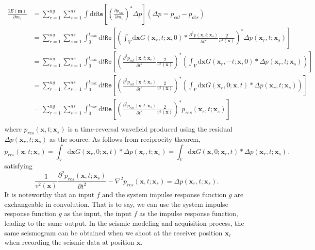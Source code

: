\begin{equation}
\begin{split}
\frac{\partial E(\textbf{m})}{\partial m_i}
&=\sum_{r=1}^{ng}\sum_{s=1}^{ns}\int \mathrm{d}t\mathtt{Re} \left[\left(\frac{\partial p_{cal}}{\partial m_i}\right)^*\Delta p\right] (\Delta p=p_{cal}-p_{obs})\\
&=\sum_{r=1}^{ng}\sum_{s=1}^{ns}\int_{0}^{t_{\max}}\mathrm{d}t\mathtt{Re} \left[\left(\int_V \mathrm{d}\textbf{x} G(\textbf{x}_r,t;\textbf{x},0)*
\frac{\partial^2 p(\textbf{x},t;\textbf{x}_s)}{\partial t^2}\frac{2}{v^3(\textbf{x})}\right)^*\Delta p(\textbf{x}_r,t;\textbf{x}_s)\right]\\
&=\sum_{r=1}^{ng}\sum_{s=1}^{ns}\int_{0}^{t_{\max}}\mathrm{d}t\mathtt{Re} \left[\left(
\frac{\partial^2 p_{cal}(\textbf{x},t;\textbf{x}_s)}{\partial t^2}\frac{2}{v^3(\textbf{x})}\right)^*(\int_V \mathrm{d}\textbf{x} G(\textbf{x}_r,-t;\textbf{x},0)*\Delta p(\textbf{x}_r,t;\textbf{x}_s))\right]\\
&=\sum_{r=1}^{ng}\sum_{s=1}^{ns}\int_{0}^{t_{\max}}\mathrm{d}t\mathtt{Re} \left[\left(
\frac{\partial^2 p_{cal}(\textbf{x},t;\textbf{x}_s)}{\partial t^2}\frac{2}{v^3(\textbf{x})}\right)^*(\int_V \mathrm{d}\textbf{x} G(\textbf{x}_r,0;\textbf{x},t)*\Delta p(\textbf{x}_r,t;\textbf{x}_s))\right]\\
&=\sum_{r=1}^{ng}\sum_{s=1}^{ns}\int_{0}^{t_{\max}}\mathrm{d}t\mathtt{Re} \left[\left(
\frac{\partial^2 p_{cal}(\textbf{x},t;\textbf{x}_s)}{\partial t^2}\frac{2}{v^3(\textbf{x})}\right)^*p_{res}(\textbf{x}_r,t;\textbf{x}_s)\right]\\
\end{split}
\end{equation}
where $p_{res}(\textbf{x},t;\textbf{x}_s)$ is a time-reversal wavefield produced using the residual $\Delta p(\textbf{x}_r,t;\textbf{x}_s)$ as the source. As follows from reciprocity theorem,
\begin{equation} 
p_{res}(\textbf{x},t;\textbf{x}_s)
=\int_V \mathrm{d}\textbf{x} G(\textbf{x}_r,0;\textbf{x},t)*\Delta p(\textbf{x}_r,t;\textbf{x}_s)
=\int_V \mathrm{d}\textbf{x} G(\textbf{x},0;\textbf{x}_r,t)*\Delta p(\textbf{x}_r,t;\textbf{x}_s).
\end{equation}
satisfying
\begin{equation}
\frac{1}{v^2(\textbf{x})}\frac{\partial^2 p_{res}(\textbf{x},t;\textbf{x}_s)}{\partial t^2}-\nabla^2 p_{res}(\textbf{x},t;\textbf{x}_s)=\Delta p(\textbf{x}_r,t;\textbf{x}_s).
\end{equation}
It is noteworthy that an input $f$ and the system impulse response function $g$ are exchangeable in convolution. That is to say, we can use the system impulse response function $g$ as the input, the input $f$ as the impulse response function, leading to the same output. In the seismic modeling and acquisition process, the same seismogram can be obtained when we shoot at the receiver position $\textbf{x}_r$ when recording the seismic data at position $\textbf{x}$.








